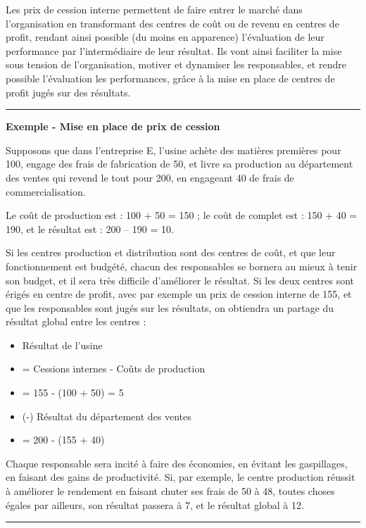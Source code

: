 \documentclass[oneside]{kaobook}
\begin{document}
Les prix de cession interne permettent de faire entrer le marché dans l’organisation en transformant des centres de coût ou de revenu en centres de profit, rendant ainsi possible (du moins en apparence) l’évaluation de leur performance par l’intermédiaire de leur résultat. Ils vont ainsi faciliter la mise sous tension de l’organisation, motiver et dynamiser les responsables, et rendre possible l’évaluation les performances, grâce à la mise en place de centres de profit jugés sur des résultats. 

\noindent\rule{\textwidth}{0.5pt}
\textbf{Exemple - Mise en place de prix de cession}

Supposons que dans l’entreprise E, l'usine achète des matières premières pour 100, engage des frais de fabrication de 50, et livre sa production au département des ventes qui revend le tout pour 200, en engageant 40 de frais de commercialisation.

Le coût de production est : 100 + 50 = 150 ; le coût de complet est : 150 + 40 = 190, et le résultat est : 200 – 190 = 10.

Si les centres production et distribution sont des centres de coût, et que leur fonctionnement est budgété, chacun des responsables se bornera au mieux à tenir son budget, et il sera très difficile d’améliorer le résultat. Si les deux centres sont érigés en centre de profit, avec par exemple un prix de cession interne de 155, et que les responsables sont jugés sur les résultats, on obtiendra un partage du résultat global entre les centres :

\begin{itemize}
\item Résultat de l'usine
\item = Cessions internes - Coûts de production
\item = 155 - (100 + 50) = 5
\item (-) Résultat du département des ventes
\item = 200 - (155 + 40)
\end{itemize}

Chaque responsable sera incité à faire des économies, en évitant les gaspillages, en faisant des gains de productivité. Si, par exemple, le centre production réussit à améliorer le rendement en faisant chuter ses frais de 50 à 48, toutes choses égales par ailleurs, son résultat passera à 7, et le résultat global à 12. 

\noindent\rule{\textwidth}{0.5pt}
\end{document}
